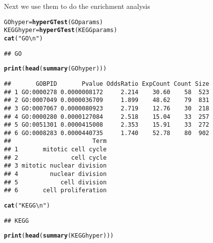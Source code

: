\documentclass{article}\usepackage[]{graphicx}\usepackage[]{color}
\makeatletter
\newcommand{\hlstr}[1]{\textcolor[rgb]{0.192,0.494,0.8}{#1}}%
\newcommand{\hlstd}[1]{\textcolor[rgb]{0.345,0.345,0.345}{#1}}%
\newcommand{\hlkwb}[1]{\textcolor[rgb]{0.69,0.353,0.396}{#1}}%
\newcommand{\hlkwd}[1]{\textcolor[rgb]{0.737,0.353,0.396}{\textbf{#1}}}%
\newenvironment{kframe}{%
 \def\at@end@of@kframe{}%
 \ifinner\ifhmode%
  \def\at@end@of@kframe{\end{minipage}}%
  \begin{minipage}{\columnwidth}%
 \fi\fi%
 \def\FrameCommand##1{\hskip\@totalleftmargin \hskip-\fboxsep
 \colorbox{shadecolor}{##1}\hskip-\fboxsep
     \hskip-\linewidth \hskip-\@totalleftmargin \hskip\columnwidth}%
 \MakeFramed {\advance\hsize-\width
   \@totalleftmargin\z@ \linewidth\hsize
   \@setminipage}}%
 {\par\unskip\endMakeFramed%
 \at@end@of@kframe}
\newenvironment{knitrout}{}{} %
\makeatother
\begin{document}
Next we use them to do the enrichment analysis
\begin{knitrout}
\color{fgcolor}\begin{kframe}
\begin{alltt}
\hlstd{GOhyper} \hlkwb{=} \hlkwd{hyperGTest}\hlstd{(GOparams)}
\hlstd{KEGGhyper} \hlkwb{=} \hlkwd{hyperGTest}\hlstd{(KEGGparams)}
\hlkwd{cat}\hlstd{(}\hlstr{"GO\textbackslash{}n"}\hlstd{)}
\end{alltt}
\begin{verbatim}
## GO
\end{verbatim}
\begin{alltt}
\hlkwd{print}\hlstd{(}\hlkwd{head}\hlstd{(}\hlkwd{summary}\hlstd{(GOhyper)))}
\end{alltt}
\begin{verbatim}
##       GOBPID       Pvalue OddsRatio ExpCount Count Size
## 1 GO:0000278 0.0000008172     2.214    30.60    58  523
## 2 GO:0007049 0.0000036709     1.899    48.62    79  831
## 3 GO:0007067 0.0000080923     2.719    12.76    30  218
## 4 GO:0000280 0.0000127084     2.518    15.04    33  257
## 5 GO:0051301 0.0000415008     2.353    15.91    33  272
## 6 GO:0008283 0.0000440735     1.740    52.78    80  902
##                       Term
## 1       mitotic cell cycle
## 2               cell cycle
## 3 mitotic nuclear division
## 4         nuclear division
## 5            cell division
## 6       cell proliferation
\end{verbatim}
\begin{alltt}
\hlkwd{cat}\hlstd{(}\hlstr{"KEGG\textbackslash{}n"}\hlstd{)}
\end{alltt}
\begin{verbatim}
## KEGG
\end{verbatim}
\begin{alltt}
\hlkwd{print}\hlstd{(}\hlkwd{head}\hlstd{(}\hlkwd{summary}\hlstd{(KEGGhyper)))}
\end{alltt}



\end{kframe}
\end{knitrout}
\end{document}
